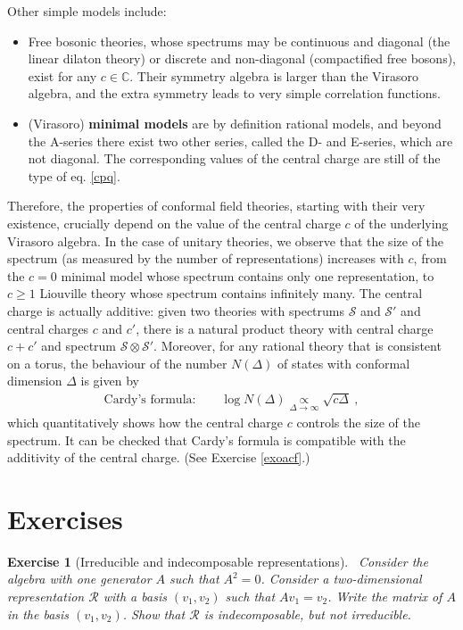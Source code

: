 \documentclass[12pt, a4paper, notitlepage, twoside]{report}
\numberwithin{equation}{section}
\theoremstyle{break}
\newtheorem{exo}{Exercise}[chapter]
\begin{document}
Other simple models include:
\begin{itemize}
 \item Free bosonic theories, whose spectrums may be continuous and diagonal (the linear dilaton theory) or discrete and non-diagonal (compactified free bosons), exist for any $c\in {\mathbb{C}}$.
Their symmetry algebra is larger than the Virasoro algebra, and  
the extra symmetry leads to very simple correlation functions.
 \item 
(Virasoro) \textbf{minimal models} are by definition rational models, and beyond the A-series there exist two other series, called the 
D- and E-series, which are not diagonal.
The corresponding values of the central charge are still of the type of eq. \eqref{cpq}.
\end{itemize}
Therefore,
the properties of conformal field theories, starting with their very existence, crucially depend on the value of the central charge $c$ of the underlying Virasoro algebra.
In the case of unitary theories, we observe that the size of the spectrum (as measured by the number of representations) increases with $c$, from the $c=0$ minimal model whose spectrum contains only one representation, to $c\geq 1$ Liouville theory whose spectrum contains infinitely many.
The central charge is actually additive: given two theories with spectrums $\mathcal{S}$ and $\mathcal{S}'$ and central charges $c$ and $c'$, there is a natural product theory with central charge $c+c'$ and spectrum $\mathcal{S}\otimes \mathcal{S}'$.
Moreover, for any rational theory that is consistent on a torus, 
the behaviour of the number $N(\Delta)$ of states with conformal dimension $\Delta$ is given by 
\begin{align}
\text{Cardy's formula:} \qquad \log N(\Delta) \underset{\Delta\to \infty}{\propto} \sqrt{c \Delta} \ ,
\label{nds}
\end{align}
which quantitatively shows how the central charge $c$ controls the size of the spectrum.
It can be checked that Cardy's formula is compatible with the additivity of the central charge. (See Exercise \ref{exoacf}.)

\section{Exercises}


\begin{exo}[Irreducible and indecomposable representations] 
~\label{exoirr}
Consider the algebra with one generator $A$ such that $A^2 = 0$.
Consider a two-dimensional representation $\mathcal{R}$ with a basis $(v_1,v_2)$ such that $Av_1=v_2$.
Write the matrix of $A$ in the basis $(v_1,v_2)$.
Show that $\mathcal{R}$ is indecomposable, but not irreducible. 
\end{exo}
\end{document}
